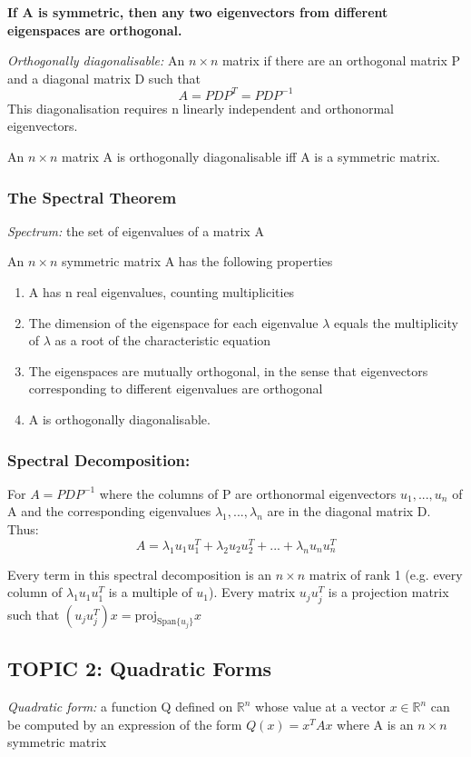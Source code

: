 \documentclass[12pt]{article} %
\newcommand{\R}{\mathbb{R}}
\begin{document}
\textbf{If A is symmetric, then any two eigenvectors from different eigenspaces are orthogonal.}

\emph{Orthogonally diagonalisable:} An $n \times n$ matrix if there are an orthogonal matrix P and a diagonal matrix D such that 
$$A = PDP^T = PDP^{-1}$$
This diagonalisation requires n linearly independent and orthonormal eigenvectors.

An $n\times n$ matrix A is orthogonally diagonalisable iff A is a symmetric matrix.


\subsubsection{The Spectral Theorem}
\emph{Spectrum:} the set of eigenvalues of a matrix A

An $n \times n$ symmetric matrix A has the following properties
\begin{enumerate}
	\item A has n real eigenvalues, counting multiplicities
	\item The dimension of the eigenspace for each eigenvalue $\lambda$ equals the multiplicity of $\lambda$ as a root of the characteristic equation
	\item The eigenspaces are mutually orthogonal, in the sense that eigenvectors corresponding to different eigenvalues are orthogonal
	\item A is orthogonally diagonalisable.
\end{enumerate}

\subsubsection{Spectral Decomposition:}
For $A = PDP^{-1}$ where the columns of P are orthonormal eigenvectors $u_1, ..., u_n$ of A and the corresponding eigenvalues $\lambda_1, ..., \lambda_n$ are in the diagonal matrix D. Thus:
$$A = \lambda_1 u_1 u_1^T + \lambda_2 u_2 u_2^T + ... + \lambda_n u_n u_n^T$$

Every term in this spectral decomposition is an $n\times n$ matrix of rank 1 (e.g. every column of $\lambda_1 u_1 u_1^T$ is a multiple of $u_1$).
Every matrix $u_j u_j^T$ is a projection matrix such that $(u_j u_j^T)x = \text{proj}_{\text{Span}\{u_j\}} x$

\subsection{TOPIC 2: Quadratic Forms}
\emph{Quadratic form:} a function Q defined on $\R^n$ whose value at a vector $x \in \R^n$ can be computed by an expression of the form $Q(x) = x^T Ax$ where A is an $n \times n$ symmetric matrix
\end{document}
